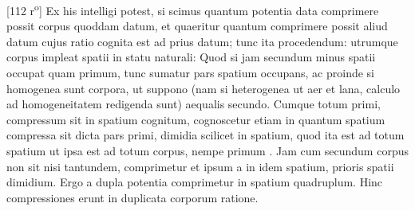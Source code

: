  [112 r\textsuperscript{o}] Ex his intelligi potest, si scimus quantum potentia data comprimere possit corpus quoddam datum, et quaeritur quantum comprimere possit aliud datum cujus ratio cognita est ad prius datum; tunc ita procedendum:  utrumque corpus impleat spatii in statu naturali\protect{}: Quod si jam secundum minus spatii  occupat quam primum, tunc sumatur pars  spatium occupans, ac proinde si homogenea sunt corpora, ut suppono (nam si heterogenea ut aer et lana, calculo ad homogeneitatem redigenda sunt) aequalis secundo. Cumque totum primi, compressum sit in spatium cognitum, cognoscetur etiam in quantum spatium compressa sit dicta pars primi, dimidia scilicet in spatium, quod ita est ad totum spatium ut ipsa  est ad totum  corpus, nempe primum . Jam cum secundum corpus non sit nisi tantundem, comprimetur et ipsum a  in idem spatium,  prioris spatii dimidium. Ergo a dupla potentia comprimetur in spatium quadruplum. Hinc compressiones\protect{} erunt in duplicata corporum ratione.
\pend